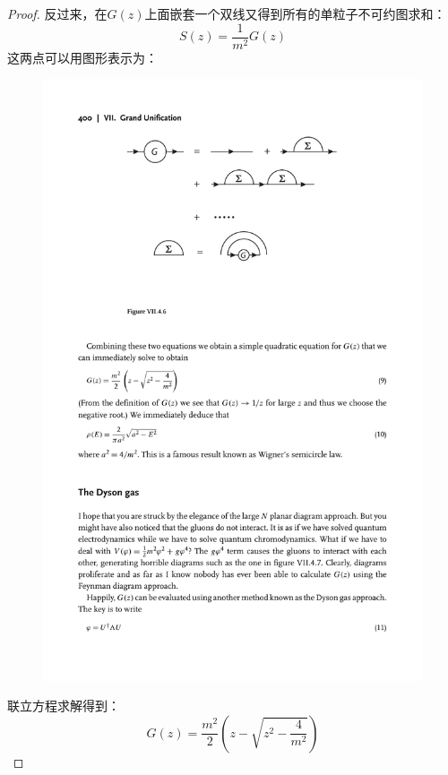 \begin{proof}
	反过来，在$G(z)$上面嵌套一个双线又得到所有的单粒子不可约图求和：
	\begin{equation}
		S(z)=\frac1{m^2}G(z)
	\end{equation}
	这两点可以用图形表示为：
	\begin{figure}[H]
		\centering
		\includegraphics{figs/fig11.pdf}
	\end{figure}
	联立方程求解得到：
	\begin{equation}
		G(z)=\frac{m^2}2(z-\sqrt{z^2-\frac4{m^2}})
	\end{equation}
\end{proof}

